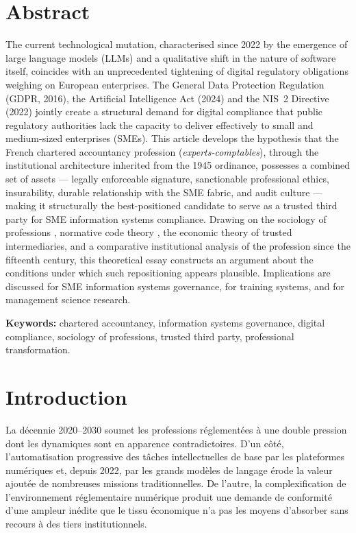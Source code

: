 \documentclass[12pt,a4paper]{article}
\begin{document}
\section*{Abstract}

The current technological mutation, characterised since 2022 by the emergence of large language models (LLMs) and a qualitative shift in the nature of software itself, coincides with an unprecedented tightening of digital regulatory obligations weighing on European enterprises. The General Data Protection Regulation (GDPR, 2016), the Artificial Intelligence Act (2024) and the NIS~2 Directive (2022) jointly create a structural demand for digital compliance that public regulatory authorities lack the capacity to deliver effectively to small and medium-sized enterprises (SMEs). This article develops the hypothesis that the French chartered accountancy profession (\textit{experts-comptables}), through the institutional architecture inherited from the 1945 ordinance, possesses a combined set of assets — legally enforceable signature, sanctionable professional ethics, insurability, durable relationship with the SME fabric, and audit culture — making it structurally the best-positioned candidate to serve as a trusted third party for SME information systems compliance. Drawing on the sociology of professions \parencite{abbott1988}, normative code theory \parencite{lessig1999}, the economic theory of trusted intermediaries, and a comparative institutional analysis of the profession since the fifteenth century, this theoretical essay constructs an argument about the conditions under which such repositioning appears plausible. Implications are discussed for SME information systems governance, for training systems, and for management science research.

\textbf{Keywords:} chartered accountancy, information systems governance, digital compliance, sociology of professions, trusted third party, professional transformation.

\tableofcontents
\newpage

\section{Introduction}

La décennie 2020--2030 soumet les professions réglementées à une double pression dont les dynamiques sont en apparence contradictoires. D'un côté, l'automatisation progressive des tâches intellectuelles de base par les plateformes numériques et, depuis 2022, par les grands modèles de langage érode la valeur ajoutée de nombreuses missions traditionnelles. De l'autre, la complexification de l'environnement réglementaire numérique produit une demande de conformité d'une ampleur inédite que le tissu économique n'a pas les moyens d'absorber sans recours à des tiers institutionnels.
\end{document}
